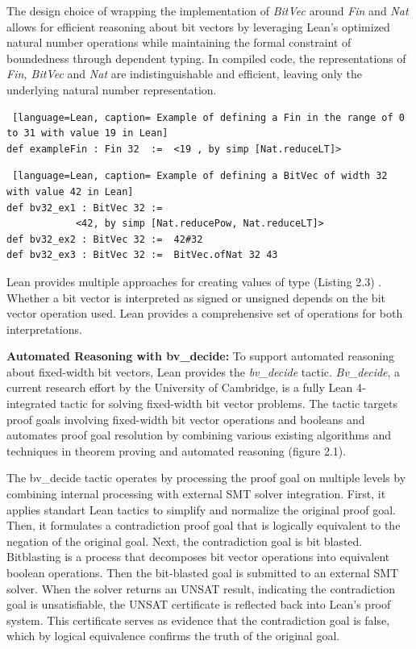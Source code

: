  The design choice of wrapping the implementation of \textit{BitVec} around \textit{Fin} and \textit{Nat} allows for efficient reasoning about bit vectors by leveraging Lean's optimized natural number operations while maintaining the formal constraint of boundedness through dependent typing.
In compiled code, the representations of \textit{Fin, BitVec}  and \textit{Nat} are indistinguishable and efficient, leaving only the underlying natural number representation.



\begin{lstlisting} [language=Lean, caption= Example of defining a Fin in the range of 0 to 31 with value 19 in Lean]
def exampleFin : Fin 32  :=  <19 , by simp [Nat.reduceLT]>
\end{lstlisting}
\begin{lstlisting} [language=Lean, caption= Example of defining a BitVec of width 32 with value 42 in Lean]
def bv32_ex1 : BitVec 32 :=  
            <42, by simp [Nat.reducePow, Nat.reduceLT]>
def bv32_ex2 : BitVec 32 :=  42#32
def bv32_ex3 : BitVec 32 :=  BitVec.ofNat 32 43 
\end{lstlisting}
 Lean provides multiple approaches for creating values of type  (Listing 2.3) . Whether a bit vector is interpreted as signed or unsigned depends on the bit vector operation used. Lean provides a comprehensive set of operations for both interpretations.

\textbf{Automated Reasoning with bv\_decide:}
To support automated reasoning about fixed-width bit vectors, Lean provides the \textit{bv\_decide} tactic. \textit{Bv\_decide}, a current research effort by the University of Cambridge, is a fully Lean 4-integrated tactic for solving fixed-width bit vector problems. The tactic targets proof goals involving fixed-width bit vector operations and booleans and automates proof goal resolution by combining various existing algorithms and techniques in theorem proving and automated reasoning (figure 2.1).

The bv\_decide tactic operates by processing the proof goal on multiple levels by combining internal processing with external  SMT solver integration. First, it applies standart Lean tactics to simplify and normalize the original proof goal. Then, it formulates a contradiction proof goal that is logically equivalent to the negation of the original goal. Next, the contradiction goal is bit blasted. Bitblasting is a process that decomposes bit vector operations into equivalent boolean operations. Then the bit-blasted goal is submitted to an external SMT solver. When the solver returns an UNSAT result, indicating the contradiction goal is unsatisfiable, the UNSAT certificate is reflected back into Lean's proof system. This certificate serves as evidence that the contradiction goal is false, which by logical equivalence confirms the truth of the original goal.


